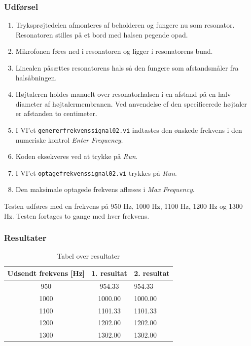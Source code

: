 		\subsubsection{Udførsel}
			
			\begin{enumerate}
				\item Tryksprøjtedelen afmonteres af beholderen og fungere nu som resonator. Resonatoren stilles på et bord med halsen pegende opad. 
				\item Mikrofonen føres ned i resonatoren og ligger i resonatorens bund. 
				\item Linealen påsættes resonatorens hals så den fungere som afstandsmåler fra halsåbningen.
				\item Højtaleren holdes manuelt over resonatorhalsen i en afstand på en halv diameter af højtalermembranen. Ved anvendelse ef den specificerede højtaler er afstanden to centimeter. 
				\item I VI'et \texttt{genererfrekvenssignal02.vi} indtastes den ønskede frekvens i den numeriske kontrol \textit{Enter Frequency}. 
					
						\item Koden eksekveres ved at trykke på \textit{Run}. 
				
				\item I VI'et \texttt{optagefrekvenssignal02.vi} trykkes på \textit{Run}. 
					
						\item Den maksimale optagede frekvens aflæses i \textit{Max Frequency}. 
					
			\end{enumerate}
			
			Testen udføres med en frekvens på 950 Hz, 1000 Hz, 1100 Hz, 1200 Hz og 1300 Hz. Testen fortages to gange med hver frekvens.  
			
			\subsubsection{Resultater}
			
			\begin{table}[]
				\centering
				\caption{Tabel over resultater}
				\label{bordtest5resultater}
				\begin{tabular}{lll}
					\multicolumn{1}{l|}{\textbf{Udsendt frekvens {[}Hz{]}}} & 	
					\multicolumn{1}{l|}{\textbf{1. resultat}} & \textbf{2. resultat} \\ \hline
					\multicolumn{1}{c|}{950}& 
					\multicolumn{1}{c|}{954.33}&954.33\\
					\multicolumn{1}{c|}{1000}& 
					\multicolumn{1}{c|}{1000.00}&1000.00\\
					\multicolumn{1}{c|}{1100}& 
					\multicolumn{1}{c|}{1101.33}&1101.33\\
					\multicolumn{1}{c|}{1200}& 
					\multicolumn{1}{c|}{1202.00}&1202.00\\
					\multicolumn{1}{c|}{1300}& 
					\multicolumn{1}{c|}{1302.00}&1302.00\\
                   
				\end{tabular}
			\end{table}
			
